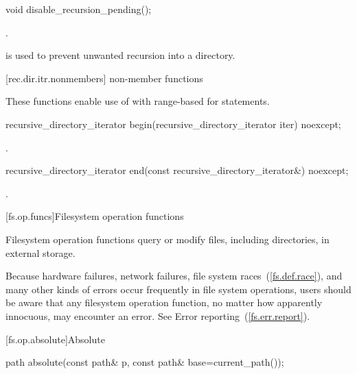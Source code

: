 \begin{itemdecl}
void disable_recursion_pending();
\end{itemdecl}

\begin{itemdescr}
\pnum
\postcondition {}.

\pnum
\begin{note} \tcode{()} is used to prevent
  unwanted recursion into a directory. \end{note}
\end{itemdescr}

[rec.dir.itr.nonmembers]{ non-member functions}

\pnum
These functions enable use of 
with range-based for statements.

\begin{itemdecl}
recursive_directory_iterator begin(recursive_directory_iterator iter) noexcept;
\end{itemdecl}

\begin{itemdescr}
\pnum
\returns {}.
\end{itemdescr}

\begin{itemdecl}
recursive_directory_iterator end(const recursive_directory_iterator&) noexcept;
\end{itemdecl}

\begin{itemdescr}
\pnum
\returns {}.
\end{itemdescr}

[fs.op.funcs]{Filesystem operation functions}

\pnum
Filesystem operation functions query or modify files, including directories,
in external storage.

\pnum
\begin{note} Because hardware failures, network failures, file system races~(\ref{fs.def.race}),
and many other kinds of errors occur frequently in file system operations, users should be aware
that any filesystem operation function, no matter how apparently innocuous, may encounter
an error. See Error reporting~(\ref{fs.err.report}). \end{note}

[fs.op.absolute]{Absolute}

\begin{itemdecl}
path absolute(const path& p, const path& base=current_path());
\end{itemdecl}

